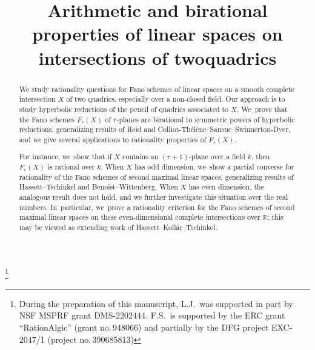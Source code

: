 \documentclass[JEP,XML,SOM,Unicode,NoEqCountersInSection,published]{cedram}
\theoremstyle{plain}
\theoremstyle{definition}
\begin{document}
\frontmatter

\title[Linear spaces on intersections of two quadrics]{Arithmetic and birational properties of linear spaces on intersections of two\nobreakspace quadrics}

\author[\initial{L.} \lastname{Ji}]{ }
\address{Department of Mathematics, University of Illinois Urbana-Champaign,\\
273 Altgeld Hall, 1409 W. Green Street, Urbana, IL 61801, USA}

\author[\initial{F.} \lastname{Suzuki}]{ }
\address{Institute of Algebraic Geometry, Leibniz University Hannover,\\ Welfengarten 1, 30167, Hannover, Germany}

\thanks{During the preparation of this manuscript,
L.J.\ was supported in part by NSF MSPRF grant DMS-2202444.
F.S.\ is supported by the ERC grant ``RationAlgic'' (grant no.\,948066) and partially by the DFG project EXC-2047/1 (project no.\,390685813)}

\begin{abstract}
We study rationality questions for Fano schemes of linear spaces on a smooth complete intersection $X$ of two quadrics, especially over a non-closed field. Our approach is to study hyperbolic reductions of the pencil of quadrics associated to $X$. We~prove that the Fano schemes $F_r(X)$ of $r$-planes are birational to symmetric powers of hyperbolic reductions, generalizing results of Reid and Colliot-Thélène--Sansuc--Swinnerton-Dyer, and we give several applications to rationality properties of $F_r(X)$.

For instance, we~show that if $X$ contains an $(r+1)$-plane over a field $k$, then $F_r(X)$ is rational over $k$. When $X$ has odd dimension, we~show a partial converse for rationality of the Fano schemes of second maximal linear spaces, generalizing results of Hassett--Tschinkel and Benoist--Wittenberg. When $X$ has even dimension, the analogous result does not hold, and we further investigate this situation over the real numbers. In~particular, we~prove a rationality criterion for the Fano schemes of second maximal linear spaces on these even-dimensional complete intersections over $\mathbb R$; this may be viewed as extending work of Hassett--Kollár--Tschinkel.
\end{abstract}
\end{document}
